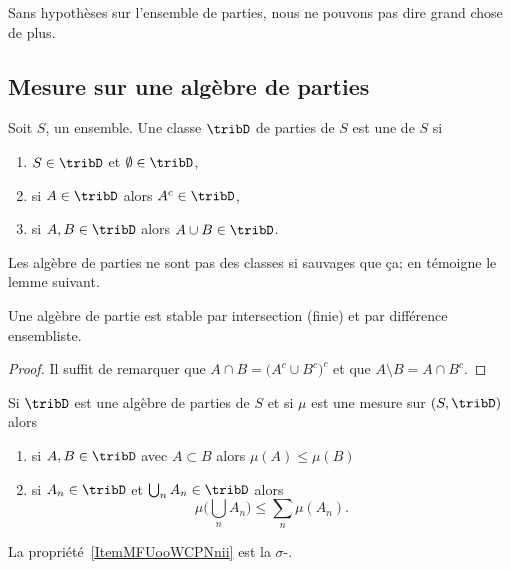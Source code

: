 Sans hypothèses sur l'ensemble de parties, nous ne pouvons pas dire grand chose de plus.

\subsection{Mesure sur une algèbre de parties}

\begin{definition}   \label{DefTCUoogGDud}
    Soit \( S\), un ensemble. Une classe \( \tribD\) de parties de \( S\) est une  de \( S\) si
    \begin{enumerate}
        \item
            \( S\in\tribD\) et \( \emptyset\in\tribD\),
        \item
            si \( A\in\tribD\) alors \( A^c\in\tribD\),
        \item
            si \( A,B\in\tribD\) alors \( A\cup B\in\tribD\).
    \end{enumerate}
\end{definition}

Les algèbre de parties ne sont pas des classes si sauvages que ça; en témoigne le lemme suivant.
\begin{lemma}   \label{LemBFKootqXKl}
    Une algèbre de partie est stable par intersection (finie) et par différence ensembliste.
\end{lemma}

\begin{proof}
    Il suffit de remarquer que \( A\cap B=\big( A^c\cup B^c \big)^c\) et que \( A\setminus B=A\cap B^c\).
\end{proof}

\begin{lemma}  \label{LemZQUooMdCpq}
    Si \( \tribD\) est une algèbre de parties de \( S\) et si \( \mu\) est une mesure sur \( (S,\tribD)\) alors
    \begin{enumerate}
        \item
            si \( A,B\in\tribD\) avec \( A\subset B\) alors \( \mu(A)\leq \mu(B)\)
        \item   \label{ItemMFUooWCPNnii}
            si \( A_n\in\tribD\) et \( \bigcup_nA_n\in\tribD\) alors
            \begin{equation}
                \mu\big( \bigcup_nA_n \big)\leq\sum_n\mu(A_n).
            \end{equation}
    \end{enumerate}
\end{lemma}
La propriété~\ref{ItemMFUooWCPNnii} est la \( \sigma\)-.

